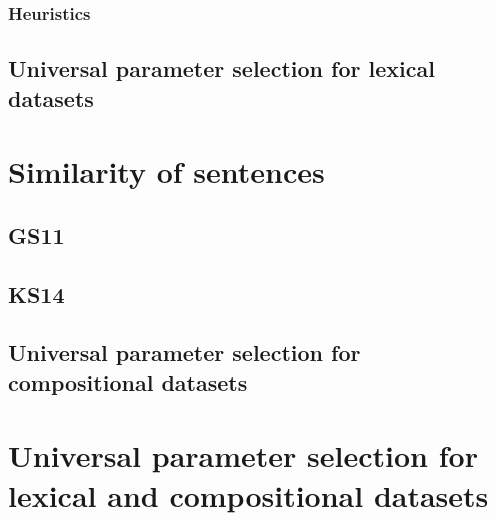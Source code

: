 \subsubsection{Heuristics}
\label{sec:heuristics-simlex}


\subsection{Universal parameter selection for lexical datasets}
\label{sec:Universal-lexical-param-selection}



\section{Similarity of sentences}
\label{sec:sentential}

\subsection{GS11}
\label{sec:gs11}




\subsection{KS14}
\label{sec:ks14}



\subsection{Universal parameter selection for compositional datasets}
\label{sec:robust-param-comp-selecion}

\section{Universal parameter selection for lexical and compositional datasets}
\label{sec:universal-param-selection}



